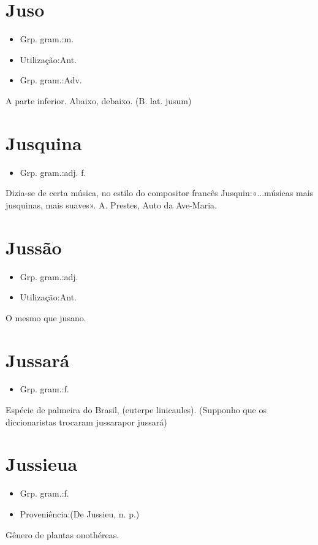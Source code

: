 \documentclass{article}
\begin{document}
\section{Juso}
\begin{itemize}
\item {Grp. gram.:m.}
\end{itemize}
\begin{itemize}
\item {Utilização:Ant.}
\end{itemize}
\begin{itemize}
\item {Grp. gram.:Adv.}
\end{itemize}
A parte inferior.
Abaixo, debaixo.
(B. lat. \textunderscore jusum\textunderscore )
\section{Jusquina}
\begin{itemize}
\item {Grp. gram.:adj. f.}
\end{itemize}
Dizia-se de certa música, no estilo do compositor francês Jusquin:«\textunderscore ...músicas mais jusquinas, mais suaves\textunderscore ». A. Prestes, \textunderscore Auto da Ave-Maria\textunderscore .
\section{Jussão}
\begin{itemize}
\item {Grp. gram.:adj.}
\end{itemize}
\begin{itemize}
\item {Utilização:Ant.}
\end{itemize}
O mesmo que \textunderscore jusano\textunderscore .
\section{Jussará}
\begin{itemize}
\item {Grp. gram.:f.}
\end{itemize}
Espécie de palmeira do Brasil, (\textunderscore euterpe linicaules\textunderscore ).
(Supponho que os diccionaristas trocaram \textunderscore jussara\textunderscore  por \textunderscore jussará\textunderscore )
\section{Jussieua}
\begin{itemize}
\item {Grp. gram.:f.}
\end{itemize}
\begin{itemize}
\item {Proveniência:(De \textunderscore Jussieu\textunderscore , n. p.)}
\end{itemize}
Gênero de plantas onothéreas.
\end{document}
